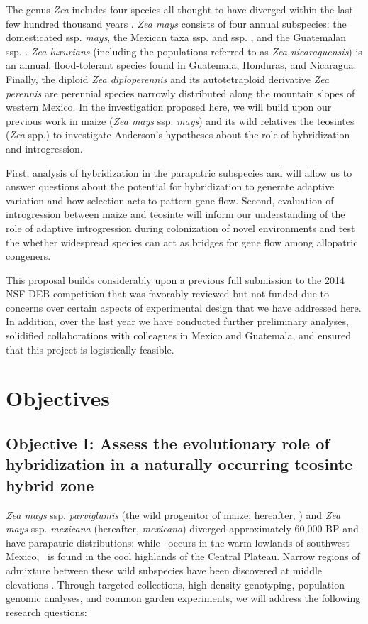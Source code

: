 The genus \emph{Zea} includes four species all thought to have diverged within the last few hundred thousand years \citep{Ross-Ibarra2009a}. \emph{Zea mays} consists of four annual subspecies: the domesticated ssp. \emph{mays}, the Mexican taxa ssp. \zp{} and ssp. \zm{}, and the Guatemalan ssp. \zh. \emph{Zea luxurians} (including the populations referred to as \emph{Zea nicaraguensis}) is an annual, flood-tolerant species found in Guatemala, Honduras, and Nicaragua. 
Finally, the diploid \emph{Zea diploperennis} and its autotetraploid derivative \emph{Zea perennis} are perennial species narrowly distributed along the mountain slopes of western Mexico. 
In the investigation proposed here, we will build upon our previous work in maize (\emph{Zea mays} ssp. \emph{mays}) and its wild relatives the teosintes (\emph{Zea} spp.) to investigate Anderson's hypotheses about the role of hybridization and introgression. 

First, analysis of hybridization in the parapatric subspecies \zp{} and \zm{} will allow us to answer questions about the potential for hybridization to generate adaptive variation and how selection acts to pattern gene flow. 
Second, evaluation of introgression between maize and teosinte will inform our understanding of the role of adaptive introgression during colonization of novel environments and test the whether widespread species can act as bridges for gene flow among allopatric congeners.

This proposal builds considerably upon a previous full submission to the 2014 NSF-DEB competition that was favorably reviewed but not funded due to concerns over certain aspects of experimental design that we have addressed here.
In addition, over the last year we have conducted further preliminary analyses, solidified collaborations with colleagues in Mexico and Guatemala, and ensured that this project is logistically feasible.

\section*{Objectives}
\subsection*{Objective I: Assess the evolutionary role of hybridization in a naturally occurring teosinte hybrid zone}
\emph{Zea mays} ssp. \emph{parviglumis} (the wild progenitor of maize; hereafter, \zp) and \emph{Zea mays} ssp. \emph{mexicana} (hereafter, \emph{mexicana}) diverged approximately 60,000 BP \citep{Ross-Ibarra2009a} and have parapatric distributions: while \zp\ occurs in the warm lowlands of southwest Mexico, \zm\  is found in the cool highlands of the Central Plateau. 
Narrow regions of admixture between these wild subspecies have been discovered at middle elevations \citep{Fukunaga2005, Pyhajarvi2013}. 
Through targeted collections, high-density genotyping, population genomic analyses, and common garden experiments, we will address the following research questions: 

